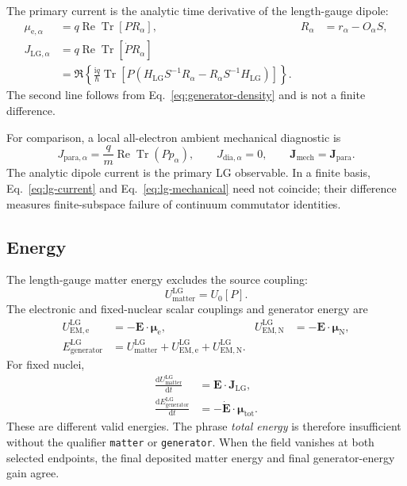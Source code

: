 \documentclass[11pt]{article}
\newcommand{\ii}{\mathrm{i}}
\newcommand{\dd}{\mathrm{d}}
\newcommand{\ReTr}{\operatorname{Re}\operatorname{Tr}}
\newcommand{\Tr}{\operatorname{Tr}}
\newcommand{\vect}[1]{\bm{#1}}
\newcommand{\code}[1]{\texttt{#1}}
\begin{document}
The primary current is the analytic time derivative of the length-gauge
dipole:
\begin{align}
 \mu_{\mathrm e,\alpha}
   &=q\ReTr[P R_\alpha],
 &R_\alpha&=r_\alpha-O_\alpha S,\\
 J_{\mathrm{LG},\alpha}
   &=q\ReTr[\dot P R_\alpha]\nonumber\\
   &=\Re\left\{
     \frac{\ii q}{\hbar}
     \Tr\left[P\left(
       H_{\mathrm{LG}}S^{-1}R_\alpha
       -R_\alpha S^{-1}H_{\mathrm{LG}}
     \right)\right]\right\}.
 \label{eq:lg-current}
\end{align}
The second line follows from Eq.~\eqref{eq:generator-density} and is not a
finite difference.

For comparison, a local all-electron ambient mechanical diagnostic is
\begin{equation}
 J_{\mathrm{para},\alpha}
 =\frac q m\ReTr(Pp_\alpha),\qquad
 J_{\mathrm{dia},\alpha}=0,\qquad
 \vect J_{\mathrm{mech}}=\vect J_{\mathrm{para}}.
 \label{eq:lg-mechanical}
\end{equation}
The analytic dipole current is the primary LG observable. In a finite basis,
Eq.~\eqref{eq:lg-current} and Eq.~\eqref{eq:lg-mechanical} need not coincide;
their difference measures finite-subspace failure of continuum commutator
identities.

\subsection{Energy}

The length-gauge matter energy excludes the source coupling:
\begin{equation}
 U_{\mathrm{matter}}^{\mathrm{LG}}=U_0[P].
\end{equation}
The electronic and fixed-nuclear scalar couplings and generator energy are
\begin{align}
 U_{\mathrm{EM,e}}^{\mathrm{LG}}
   &=-\vect E\cdot\vect\mu_{\mathrm e},&
 U_{\mathrm{EM,N}}^{\mathrm{LG}}
   &=-\vect E\cdot\vect\mu_{\mathrm N},\\
 E_{\mathrm{generator}}^{\mathrm{LG}}
   &=U_{\mathrm{matter}}^{\mathrm{LG}}
     +U_{\mathrm{EM,e}}^{\mathrm{LG}}
     +U_{\mathrm{EM,N}}^{\mathrm{LG}}.
\end{align}
For fixed nuclei,
\begin{align}
 \frac{\dd U_{\mathrm{matter}}^{\mathrm{LG}}}{\dd t}
   &=\vect E\cdot\vect J_{\mathrm{LG}},\label{eq:lg-work}\\
 \frac{\dd E_{\mathrm{generator}}^{\mathrm{LG}}}{\dd t}
   &=-\dot{\vect E}\cdot\vect\mu_{\mathrm{tot}}.
 \label{eq:lg-generator-rate}
\end{align}
These are different valid energies. The phrase \emph{total energy} is
therefore insufficient without the qualifier \code{matter} or
\code{generator}. When the field vanishes at both selected endpoints, the
final deposited matter energy and final generator-energy gain agree.
\end{document}
